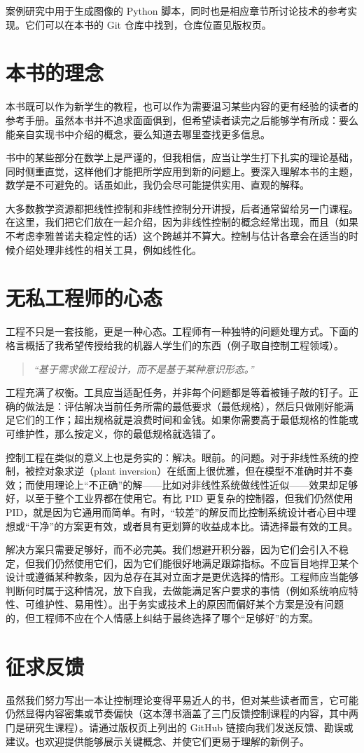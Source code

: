 案例研究中用于生成图像的 Python 脚本，同时也是相应章节所讨论技术的参考实现。它们可以在本书的 Git 仓库中找到，仓库位置见版权页。

\section{本书的理念}
\label{sec:ethos}
本书既可以作为新学生的教程，也可以作为需要温习某些内容的更有经验的读者的参考手册。虽然本书并不追求面面俱到，但希望读者读完之后能够学有所成：要么能亲自实现书中介绍的概念，要么知道去哪里查找更多信息。

书中的某些部分在数学上是严谨的，但我相信，应当让学生打下扎实的理论基础，同时侧重直觉，这样他们才能把所学应用到新的问题上。要深入理解本书的主题，数学是不可避免的。话虽如此，我仍会尽可能提供实用、直观的解释。

大多数教学资源都把线性控制和非线性控制分开讲授，后者通常留给另一门课程。在这里，我们把它们放在一起介绍，因为非线性控制的概念经常出现，而且（如果不考虑李雅普诺夫稳定性的话）这个跨越并不算大。控制与估计各章会在适当的时候介绍处理非线性的相关工具，例如线性化。

\section{无私工程师的心态}
\label{sec:mindset}
工程不只是一套技能，更是一种心态。工程师有一种独特的问题处理方式。下面的格言概括了我希望传授给我的机器人学生们的东西（例子取自控制工程领域）。

\begin{quote}
\itshape ``基于需求做工程设计，而不是基于某种意识形态。''
\end{quote}

工程充满了权衡。工具应当适配任务，并非每个问题都是等着被锤子敲的钉子。正确的做法是：评估解决当前任务所需的最低要求（最低规格），然后只做刚好能满足它们的工作；超出规格就是浪费时间和金钱。如果你需要高于最低规格的性能或可维护性，那么按定义，你的最低规格就选错了。

控制工程在类似的意义上也是务实的：解决。眼前。的问题。对于非线性系统的控制，被控对象求逆（plant inversion）在纸面上很优雅，但在模型不准确时并不奏效；而使用理论上``不正确''的解——比如对非线性系统做线性近似——效果却足够好，以至于整个工业界都在使用它。有比 PID 更复杂的控制器，但我们仍然使用 PID，就是因为它通用而简单。有时，``较差''的解反而比控制系统设计者心目中理想或``干净''的方案更有效，或者具有更划算的收益成本比。请选择最有效的工具。

解决方案只需要足够好，而不必完美。我们想避开积分器，因为它们会引入不稳定，但我们仍然使用它们，因为它们能很好地满足跟踪指标。不应盲目地捍卫某个设计或遵循某种教条，因为总存在其对立面才是更优选择的情形。工程师应当能够判断何时属于这种情况，放下自我，去做能满足客户要求的事情（例如系统响应特性、可维护性、易用性）。出于务实或技术上的原因而偏好某个方案是没有问题的，但工程师不应在个人情感上纠结于最终选择了哪个``足够好''的方案。

\section{征求反馈}
\label{sec:feedback}
虽然我们努力写出一本让控制理论变得平易近人的书，但对某些读者而言，它可能仍然显得内容密集或节奏偏快（这本薄书涵盖了三门反馈控制课程的内容，其中两门是研究生课程）。请通过版权页上列出的 GitHub 链接向我们发送反馈、勘误或建议。也欢迎提供能够展示关键概念、并使它们更易于理解的新例子。
